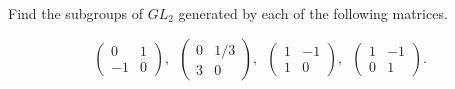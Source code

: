 \documentclass[11pt]{article}
\theoremstyle{definition}  %
\begin{document}
\begin{tcolorbox}[title=Question 3]
\item Find the subgroups of $GL_2$ generated by each of the following matrices.

  $$ \left( \begin{array}{rc} 0 & 1 \\ -1 & 0 \end{array} \right), \,\,\,
  \left( \begin{array}{cr} 0 & 1/3 \\ 3 & 0 \end{array} \right), \,\,\,
  \left( \begin{array}{rc} 1 & -1 \\ 1 & 0 \end{array} \right), \,\,\,
  \left( \begin{array}{cr} 1 & -1 \\ 0 & 1 \end{array} \right).$$
  \end{tcolorbox}
\end{document}
